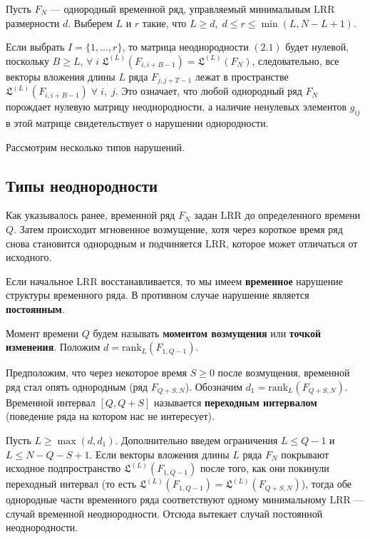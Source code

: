 \documentclass[specialist, substylefile = spbu.rtx,
			   subf, href, 12pt]{disser}
\begin{document}
Пусть $ F_N $ --- однородный временной ряд, управляемый минимальным $ \mathrm{LRR} $ размерности $ d $. Выберем $ L $ и $ r $ такие, что $ L \geq d, \; d \leq r \leq \min(L, N-L+1)$.

Если выбрать $ I = \{1, \dots, r\} $, то матрица неоднородности $ (2.1) $ будет нулевой, поскольку $ B \geq L $, $ \forall \; i \; \mathfrak{L}^{(L)}(F_{i, i+B-1}) = \mathfrak{L}^{(L)}(F_N) $, следовательно, все векторы вложения длины $ L $ ряда $ F_{j, j+T-1} $ лежат в пространстве $ \mathfrak{L}^{(L)}(F_{i, i+B-1}) \; \forall \; i,\; j $. Это означает, что любой однородный ряд $ F_N $ порождает нулевую матрицу неоднородности, а наличие ненулевых элементов $ g_{ij} $ в этой матрице свидетельствует о нарушении однородности.

Рассмотрим несколько типов нарушений.

\subsection{Типы неоднородности}

Как указывалось ранее, временной ряд $ F_N $ задан $ \mathrm{LRR} $ до определенного времени $ Q $. Затем происходит мгновенное возмущение, хотя через короткое время ряд снова становится однородным и подчиняется $ \mathrm{LRR} $, которое может отличаться от исходного.

Если начальное $ \mathrm{LRR} $ восстанавливается, то мы имеем \textbf{временное} нарушение \newline структуры временного ряда. В противном случае нарушение является \textbf{постоянным}.

Момент времени $ Q $ будем называть \textbf{моментом возмущения} или \textbf{точкой изменения}. Положим $ d = \mathrm{rank}_L(F_{1, Q-1}) $.

Предположим, что через некоторое время $ S \geq 0 $ после возмущения, временной ряд стал опять однородным (ряд $ F_{Q+S, N} $). Обозначим $ d_1 = \mathrm{rank}_L(F_{Q+S, N}) $. Временной интервал $ [Q, Q + S] $ называется \textbf{переходным интервалом} (поведение ряда на котором нас не интересует).

Пусть $ L \geq \max(d, d_1) $. Дополнительно введем ограничения $ L \leq Q-1 $ и $ L \leq N-Q-S+1 $. Если векторы вложения длины $ L $ ряда $ F_N $ покрывают исходное подпространство $ \mathfrak{L}^{(L)}(F_{1, Q-1}) $ после того, как они покинули переходный интервал (то есть  $ \mathfrak{L}^{(L)}(F_{1, Q-1}) = \mathfrak{L}^{(L)}(F_{Q+S, N})$), тогда обе однородные части временного ряда соответствуют одному минимальному $ \mathrm{LRR} $ --- случай временной неоднородности. Отсюда вытекает случай постоянной неоднородности.
\end{document}

